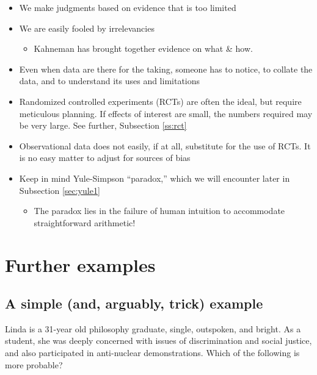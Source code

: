 \documentclass[
  10pt,
  b5paper]{book}
\providecommand{\tightlist}{%
  \setlength{\itemsep}{0pt}\setlength{\parskip}{0pt}}
\begin{document}
\begin{itemize}
\tightlist
\item
  We make judgments based on evidence that is too limited
\item
  We are easily fooled by irrelevancies

  \begin{itemize}
  \tightlist
  \item
    Kahneman has brought together evidence on what \& how.
  \end{itemize}
\item
  Even when data are there for the taking, someone has
  to notice, to collate the data, and to understand its uses
  and limitations
\item
  Randomized controlled experiments (RCTs) are often the ideal, but
  require meticulous planning. If effects of interest are small,
  the numbers required may be very large. See further,
  Subsection \ref{ss:rct}
\item
  Observational data does not easily, if at all, substitute for
  the use of RCTs. It is no easy matter to adjust for sources
  of bias
\item
  Keep in mind Yule-Simpson ``paradox,'' which we will encounter
  later in Subsection \ref{sec:yule1}

  \begin{itemize}
  \tightlist
  \item
    The paradox lies in the failure of human intuition to
    accommodate straightforward arithmetic!
  \end{itemize}
\end{itemize}

\hypertarget{further-examples}{%
\section{Further examples}\label{further-examples}}

\hypertarget{a-simple-and-arguably-trick-example}{%
\subsection*{A simple (and, arguably, trick) example}\label{a-simple-and-arguably-trick-example}}

Linda is a 31-year old philosophy graduate, single,
outspoken, and bright. As a student, she was deeply
concerned with issues of discrimination and social
justice, and also participated in anti-nuclear
demonstrations. Which of the following is more probable?
\end{document}
